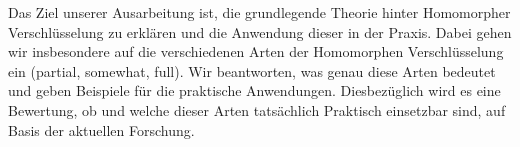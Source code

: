 \label{sec:ziel}
    Das Ziel unserer Ausarbeitung ist, die grundlegende Theorie  hinter
    Homomorpher Verschlüsselung zu erklären und die Anwendung dieser in der Praxis. 
    Dabei gehen wir insbesondere auf die verschiedenen Arten der Homomorphen Verschlüsselung 
    ein (partial, somewhat, full).  Wir beantworten, was genau diese Arten bedeutet und geben 
    Beispiele für die praktische Anwendungen. Diesbezüglich wird es eine Bewertung, ob und 
    welche dieser Arten tatsächlich Praktisch einsetzbar sind, auf Basis der aktuellen Forschung.
